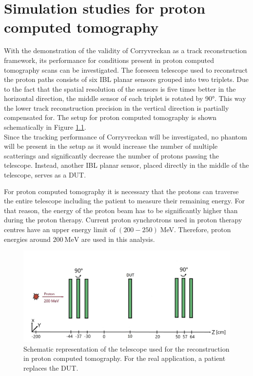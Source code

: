 \chapter{Simulation studies for proton computed tomography} \label{sec:setup}
With the demonstration of the validity of Corryvreckan as a track reconstruction framework, its performance for conditions present
in proton computed tomography scans can be investigated. The foreseen telescope used to reconstruct the proton paths consists of six IBL planar sensors
grouped into two triplets. Due to the fact that the spatial resolution of the sensors is five times better in the horizontal direction, the middle sensor
of each triplet is rotated by 90°. This way the lower track reconstruction precision in the vertical direction is partially compensated for.
The setup for proton computed tomography is shown schematically in Figure \ref{fig:phantom}. \\
Since the tracking performance of Corryvreckan will be investigated, no
phantom will be present in the setup as it would
increase the number of multiple scatterings and significantly decrease the number of protons passing the telescope. Instead, another
IBL planar sensor, placed directly in the middle of the telescope, serves as a DUT.

For proton computed tomography it is necessary that the protons can traverse the entire telescope including the patient
to measure their remaining energy. For that reason, the energy of the proton beam has to be significantly higher than during
the proton therapy. Current proton synchrotrons used in proton therapy centres have an upper energy limit of $(200 - 250)\;$MeV.
Therefore, proton energies around $\SI{200}{\mega\eV}$ are used in this analysis.

\begin{figure}
  \centering
  \includegraphics[height=0.45\textwidth]{images/phantom_proton_4.jpg}
  \caption{Schematic representation of the telescope used for the reconstruction in proton computed tomography. For the real
  application, a patient replaces the DUT.}
  \label{fig:phantom}
\end{figure}



